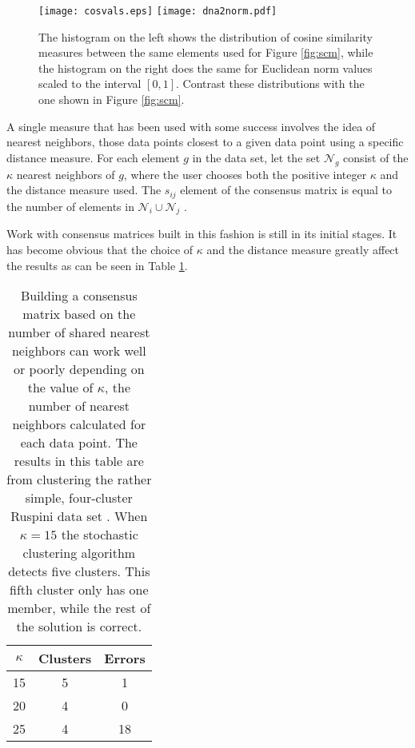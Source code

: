 \documentclass[final]{siamltex}
\begin{document}
\begin{figure}[ht]
\texttt{[image: cosvals.eps]}
\texttt{[image: dna2norm.pdf]}
\caption{The histogram on the left shows the distribution of cosine similarity measures between the same elements used for Figure \ref{fig:scm}, while the histogram on the right does the same for Euclidean norm values scaled to the interval $[0,1]$. Contrast these distributions with the one shown in Figure \ref{fig:scm}.}
\label{fig:simvals}
\end{figure}

A single measure that has been used with some success involves the idea of nearest neighbors, those data points closest to a given data point using a specific distance measure. For each element $g$ in the data set, let the set $\mathcal{N}_{g}$ consist of the $\kappa$ nearest neighbors of $g$, where the user chooses both the positive integer $\kappa$ and the distance measure used. The $s_{ij}$ element of the consensus matrix is equal to the number of elements in $\mathcal{N}_{i} \cup \mathcal{N}_{j}$ \cite{abbey2011pc}.

Work with consensus matrices built in this fashion is still in its initial stages. It has become obvious that the choice of $\kappa$ and the distance measure greatly affect the results as can be seen in Table \ref{tbl:knn}.

\begin{table}[ht]
\caption{Building a consensus matrix based on the number of shared nearest neighbors can work well or poorly depending on the value of $\kappa$, the number of nearest neighbors calculated for each data point. The results in this table are from clustering the rather simple, four-cluster Ruspini data set \cite{ruspini}. When $\kappa=15$ the stochastic clustering algorithm detects five clusters. This fifth cluster only has one member, while the rest of the solution is correct.}
\begin{center}
\begin{tabular}{|c|c|c|} \hline
$\kappa$ & Clusters & Errors \\ \hline
15 & 5 & 1 \\
20 & 4 & 0 \\
25 & 4 & 18 \\ \hline
\end{tabular}
\end{center}
\label{tbl:knn}
\end{table}

 
\end{document}
